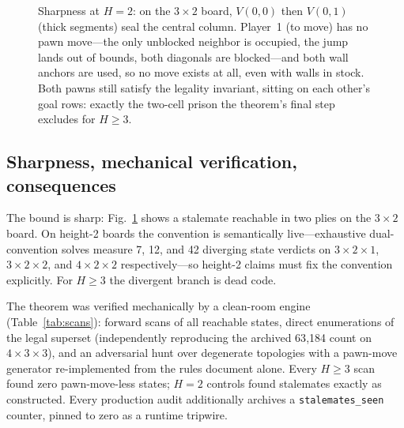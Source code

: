 \documentclass[conference]{IEEEtran}
\newcommand{\varSpec}[3]{$#1{\times}#2{\times}#3$}
\begin{document}
\begin{figure}[t]
\centering
{}
\caption{Sharpness at $H=2$: on the $3\times 2$ board, $V(0,0)$ then $V(0,1)$ (thick segments) seal the central column. Player~1 (to move) has no pawn move---the only unblocked neighbor is occupied, the jump lands out of bounds, both diagonals are blocked---and both wall anchors are used, so no move exists at all, even with walls in stock. Both pawns still satisfy the legality invariant, sitting on each other's goal rows: exactly the two-cell prison the theorem's final step excludes for $H\geq 3$.}
\label{fig:stalemate}
\end{figure}

\subsection{Sharpness, mechanical verification, consequences}

The bound is sharp: Fig.~\ref{fig:stalemate} shows a stalemate reachable in two plies on the $3\times 2$ board. On height-2 boards the convention is semantically live---exhaustive dual-convention solves measure 7, 12, and 42 diverging state verdicts on \varSpec{3}{2}{1}, \varSpec{3}{2}{2}, and \varSpec{4}{2}{2} respectively---so height-2 claims must fix the convention explicitly. For $H\geq 3$ the divergent branch is dead code.

The theorem was verified mechanically by a clean-room engine (Table~\ref{tab:scans}): forward scans of all reachable states, direct enumerations of the legal superset (independently reproducing the archived 63{,}184 count on \varSpec{4}{3}{3}), and an adversarial hunt over degenerate topologies with a pawn-move generator re-implemented from the rules document alone. Every $H\geq 3$ scan found zero pawn-move-less states; $H=2$ controls found stalemates exactly as constructed. Every production audit additionally archives a \texttt{stalemates\_seen} counter, pinned to zero as a runtime tripwire.
\end{document}
